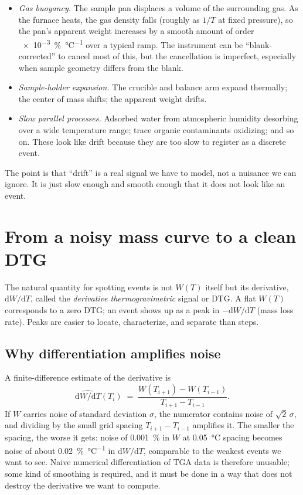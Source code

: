 \documentclass[11pt]{article}
\newcommand{\dwdT}{\mathrm{d}W/\mathrm{d}T}
\begin{document}
\begin{itemize}
  \item \emph{Gas buoyancy.} The sample pan displaces a volume of the
        surrounding gas. As the furnace heats, the gas density falls
        (roughly as $1/T$ at fixed pressure), so the pan's apparent
        weight increases by a smooth amount of order
        \qty{e-3}{\percent\per\celsius} over a typical ramp.  The
        instrument can be ``blank-corrected'' to cancel most of this,
        but the cancellation is imperfect, especially when sample
        geometry differs from the blank.
  \item \emph{Sample-holder expansion.} The crucible and balance arm
        expand thermally; the center of mass shifts; the apparent
        weight drifts.
  \item \emph{Slow parallel processes.} Adsorbed water from atmospheric
        humidity desorbing over a wide temperature range; trace
        organic contaminants oxidizing; and so on. These look like
        drift because they are too slow to register as a discrete
        event.
\end{itemize}

The point is that ``drift'' is a real signal we have to model, not a
nuisance we can ignore. It is just slow enough and smooth enough that
it does not look like an event.

\section{From a noisy mass curve to a clean DTG}

The natural quantity for spotting events is not $W(T)$ itself but its
derivative, $\dwdT$, called the \emph{derivative thermogravimetric}
signal or DTG. A flat $W(T)$ corresponds to a zero DTG; an event shows
up as a peak in $-\dwdT$ (mass loss rate). Peaks are easier to locate,
characterize, and separate than steps.

\subsection{Why differentiation amplifies noise}

A finite-difference estimate of the derivative is
\[
  \widehat{\dwdT}(T_i) \;=\; \frac{W(T_{i+1}) - W(T_{i-1})}{T_{i+1} - T_{i-1}}.
\]
If $W$ carries noise of standard deviation $\sigma$, the numerator
contains noise of $\sqrt{2}\,\sigma$, and dividing by the small grid
spacing $T_{i+1}-T_{i-1}$ amplifies it. The smaller the spacing, the
worse it gets: noise of \qty{0.001}{\percent} in $W$ at
\qty{0.05}{\celsius} spacing becomes noise of about
\qty{0.02}{\percent\per\celsius} in $\dwdT$, comparable to the
weakest events we want to see. Naive numerical differentiation of TGA
data is therefore unusable; some kind of smoothing is required, and it
must be done in a way that does not destroy the derivative we want to
compute.
\end{document}
